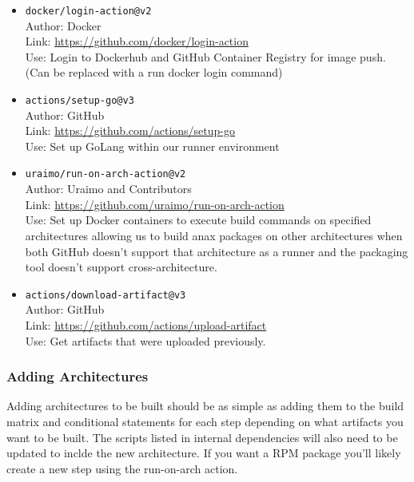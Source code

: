 \documentclass[a4paper,11pt]{article}
\begin{document}
\begin{itemize}
\begin{itemize}
\begin{itemize}
            \item\verb|docker/login-action@v2|\\Author: Docker\\Link: \href{https://github.com/docker/login-action}{https://github.com/docker/login-action}\\Use: Login to Dockerhub and GitHub Container Registry for image push. (Can be replaced with a run docker login command)
            \item\verb|actions/setup-go@v3|\\Author: GitHub\\Link: \href{https://github.com/actions/setup-go}{https://github.com/actions/setup-go}\\Use: Set up GoLang within our runner environment
            \item\verb|uraimo/run-on-arch-action@v2|\\Author: Uraimo and Contributors\\Link: \href{https://github.com/uraimo/run-on-arch-action}{https://github.com/uraimo/run-on-arch-action}\\Use: Set up Docker containers to execute build commands on specified architectures allowing us to build anax packages on other architectures when both GitHub doesn't support that architecture as a runner and the packaging tool doesn't support cross-architecture.
            \item\verb|actions/download-artifact@v3|\\Author: GitHub\\Link: \href{https://github.com/actions/upload-artifact}{https://github.com/actions/upload-artifact}\\Use: Get artifacts that were uploaded previously.
        \end{itemize}
    \end{itemize}
\end{itemize}

\subsubsection{Adding Architectures}
Adding architectures to be built should be as simple as adding them to the build matrix and conditional statements for each step depending on what artifacts you want to be built. The scripts listed in internal dependencies will also need to be updated to inclde the new architecture. If you want a RPM package you'll likely create a new step using the run-on-arch action. 
\end{document}
